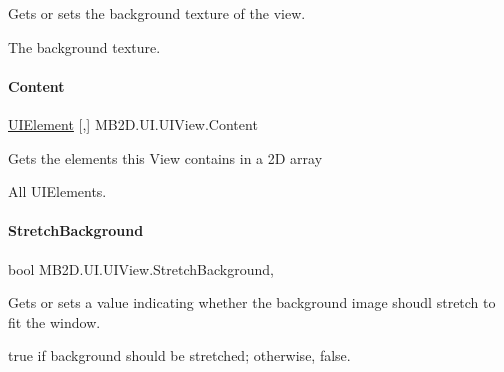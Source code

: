 Gets or sets the background texture of the view. 

The background texture.\hypertarget{class_m_b2_d_1_1_u_i_1_1_u_i_view_a873fb2ef0e28bf1d96056e43a6fe18da}{}\label{class_m_b2_d_1_1_u_i_1_1_u_i_view_a873fb2ef0e28bf1d96056e43a6fe18da} 
\paragraph{\texorpdfstring{Content}{Content}}
{\footnotesize\ttfamily \hyperlink{class_m_b2_d_1_1_u_i_1_1_u_i_element}{U\+I\+Element} \mbox{[},\mbox{]} M\+B2\+D.\+U\+I.\+U\+I\+View.\+Content\hspace{0.3cm}{\ttfamily [get]}}



Gets the elements this View contains in a 2D array 

All U\+I\+Elements.\hypertarget{class_m_b2_d_1_1_u_i_1_1_u_i_view_a715db505a27aeb27dd14c1108bda322f}{}\label{class_m_b2_d_1_1_u_i_1_1_u_i_view_a715db505a27aeb27dd14c1108bda322f} 
\paragraph{\texorpdfstring{Stretch\+Background}{StretchBackground}}
{\footnotesize\ttfamily bool M\+B2\+D.\+U\+I.\+U\+I\+View.\+Stretch\+Background\hspace{0.3cm}{\ttfamily [get]}, {\ttfamily [set]}}



Gets or sets a value indicating whether the background image shoudl stretch to fit the window. 

{\ttfamily true} if background should be stretched; otherwise, {\ttfamily false}.\hypertarget{class_m_b2_d_1_1_u_i_1_1_u_i_view_aa054a491e5acf3816240b671db3212ce}{}\label{class_m_b2_d_1_1_u_i_1_1_u_i_view_aa054a491e5acf3816240b671db3212ce} 
